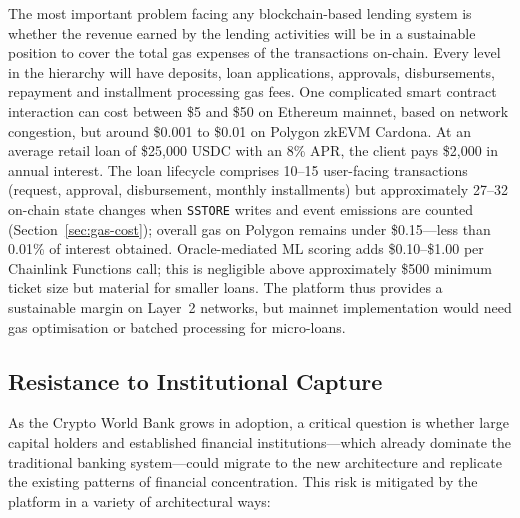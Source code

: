 \documentclass[12pt,a4paper]{report}
\begin{document}
The most important problem facing any blockchain-based lending system is whether the revenue earned by the lending activities will be in a sustainable position to cover the total gas expenses of the transactions on-chain. Every level in the hierarchy will have deposits, loan applications, approvals, disbursements, repayment and installment processing gas fees. One complicated smart contract interaction can cost between \$5 and \$50 on Ethereum mainnet, based on network congestion, but around \$0.001 to \$0.01 on Polygon zkEVM Cardona. At an average retail loan of \$25{,}000 USDC with an 8\% APR, the client pays \$2{,}000 in annual interest. The loan lifecycle comprises 10--15 user-facing transactions (request, approval, disbursement, monthly installments) but approximately 27--32 on-chain state changes when \texttt{SSTORE} writes and event emissions are counted (Section~\ref{sec:gas-cost}); overall gas on Polygon remains under \$0.15---less than 0.01\% of interest obtained. Oracle-mediated ML scoring adds \$0.10--\$1.00 per Chainlink Functions call; this is negligible above approximately \$500 minimum ticket size but material for smaller loans. The platform thus provides a sustainable margin on Layer~2 networks, but mainnet implementation would need gas optimisation or batched processing for micro-loans.

\subsection{Resistance to Institutional Capture}

As the Crypto World Bank grows in adoption, a critical question is whether large capital holders and established financial institutions---which already dominate the traditional banking system---could migrate to the new architecture and replicate the existing patterns of financial concentration. This risk is mitigated by the platform in a variety of architectural ways:
\end{document}
